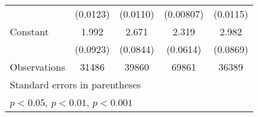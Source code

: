 {\begin{tabular*}{\textwidth}{@{\hskip\tabcolsep\extracolsep\fill}l*{4}{c}}
                    &    (0.0123)         &    (0.0110)         &   (0.00807)         &    (0.0115)         \\
\addlinespace
Constant            &       1.992\sym{***}&       2.671\sym{***}&       2.319\sym{***}&       2.982\sym{***}\\
                    &    (0.0923)         &    (0.0844)         &    (0.0614)         &    (0.0869)         \\
\midrule
Observations        &       31486         &       39860         &       69861         &       36389         \\
\bottomrule
\multicolumn{5}{l}{\footnotesize Standard errors in parentheses}\\
\multicolumn{5}{l}{\footnotesize \sym{*} \(p<0.05\), \sym{**} \(p<0.01\), \sym{***} \(p<0.001\)}\\
\end{tabular*}
}
